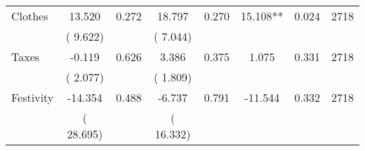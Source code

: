 \begin{tabular}{l*{7}{c}}
 Clothes       &             13.520       &        0.272  &             18.797       &        0.270  &             15.108**       &              0.024 &  2718 \\ 
                       &       (       9.622)             &                               &       (       7.044)                     &                               &                                               &                                &                      \\ 

 Taxes       &             -0.119       &        0.626  &              3.386       &        0.375  &              1.075       &              0.331 &  2718 \\ 
                       &       (       2.077)             &                               &       (       1.809)                     &                               &                                               &                                &                      \\ 

 Festivity       &            -14.354       &        0.488  &             -6.737       &        0.791  &            -11.544       &              0.332 &  2718 \\ 
                       &       (      28.695)             &                               &       (      16.332)                     &                               &                                               &                                &                      \\ 

\hline \end{tabular}